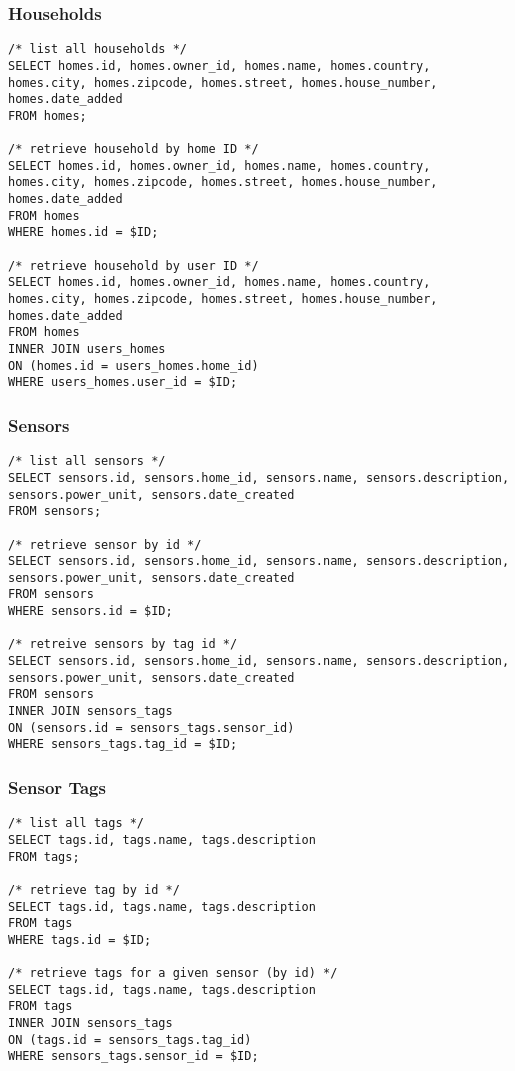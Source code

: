 \documentclass[11pt]{article}
\begin{document}
  \subsubsection{Households}
\begin{lstlisting}[style=SQL]
/* list all households */
SELECT homes.id, homes.owner_id, homes.name, homes.country, homes.city, homes.zipcode, homes.street, homes.house_number, homes.date_added
FROM homes;

/* retrieve household by home ID */
SELECT homes.id, homes.owner_id, homes.name, homes.country, homes.city, homes.zipcode, homes.street, homes.house_number, homes.date_added
FROM homes
WHERE homes.id = $ID;

/* retrieve household by user ID */
SELECT homes.id, homes.owner_id, homes.name, homes.country, homes.city, homes.zipcode, homes.street, homes.house_number, homes.date_added
FROM homes
INNER JOIN users_homes
ON (homes.id = users_homes.home_id)
WHERE users_homes.user_id = $ID;
\end{lstlisting}

  \subsubsection{Sensors}
\begin{lstlisting}[style=SQL]
/* list all sensors */
SELECT sensors.id, sensors.home_id, sensors.name, sensors.description, sensors.power_unit, sensors.date_created
FROM sensors;

/* retrieve sensor by id */
SELECT sensors.id, sensors.home_id, sensors.name, sensors.description, sensors.power_unit, sensors.date_created
FROM sensors
WHERE sensors.id = $ID;

/* retreive sensors by tag id */
SELECT sensors.id, sensors.home_id, sensors.name, sensors.description, sensors.power_unit, sensors.date_created
FROM sensors
INNER JOIN sensors_tags
ON (sensors.id = sensors_tags.sensor_id)
WHERE sensors_tags.tag_id = $ID;
\end{lstlisting}

  \subsubsection{Sensor Tags}
\begin{lstlisting}[style=SQL]
/* list all tags */
SELECT tags.id, tags.name, tags.description
FROM tags;

/* retrieve tag by id */
SELECT tags.id, tags.name, tags.description
FROM tags
WHERE tags.id = $ID;

/* retrieve tags for a given sensor (by id) */
SELECT tags.id, tags.name, tags.description
FROM tags
INNER JOIN sensors_tags
ON (tags.id = sensors_tags.tag_id)
WHERE sensors_tags.sensor_id = $ID;
\end{lstlisting}
\end{document}
